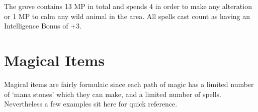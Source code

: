 \begin{multicols}{2}

The grove contains 13 MP in total and spends 4 in order to make any alteration or 1 MP to calm any wild animal in the area.
All spells cast count as having an Intelligence Bonus of +3.

\end{multicols}

\section{Magical Items}

Magical items are fairly formulaic since each path of magic has a limited number of `mana stones' which they can make, and a limited number of spells.
Nevertheless a few examples sit here for quick reference.

